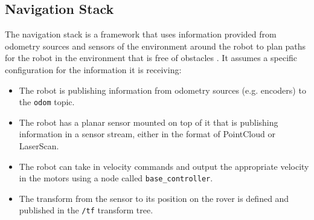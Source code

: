 \documentclass{article}
\begin{document}
          \subsection{Navigation Stack}
          The navigation stack is a framework that uses information provided from odometry sources and sensors of the environment around the robot to plan paths for the robot in the environment that is free of obstacles \cite{ROSNav}. It assumes a specific configuration for the information it is receiving:
          \begin{itemize}
          \item The robot is publishing information from odometry sources (e.g. encoders) to the \verb|odom| topic.
          \item The robot has a planar sensor mounted on top of it that is publishing information in a sensor stream, either in the format of PointCloud or LaserScan.
          \item The robot can take in velocity commands and output the appropriate velocity in the motors using a node called \verb|base_controller|.
          \item The transform from the sensor to its position on the rover is defined and published in the \verb|/tf| transform tree.
          \end{itemize}
\end{document}
